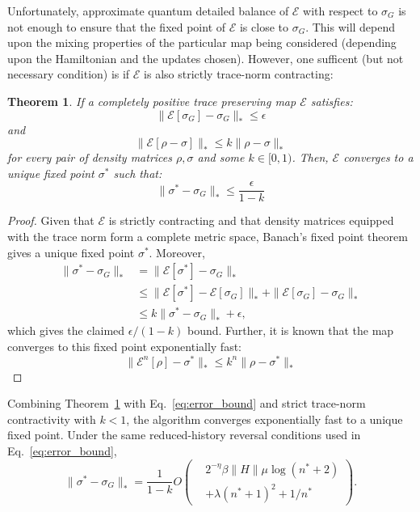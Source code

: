 \documentclass[aps,floatfix,10pt,amssymb,amsfont,amsmath,superscriptaddress,float,nofootinbib,longbibliography,nobalancelastpage,twocolumn]{revtex4-2}
\newtheorem{theorem}{Theorem}
\begin{document}
 Unfortunately, approximate quantum detailed balance of $\mathcal{E}$ with respect to $\sigma_G$ is not enough to ensure that the fixed point of $\mathcal{E}$ is close to $\sigma_G$. This will depend upon the mixing properties of the particular map being considered (depending upon the Hamiltonian and the updates chosen). However, one sufficent (but not necessary condition) is if $\mathcal{E}$ is also strictly trace-norm contracting:
 \begin{theorem}
     If a completely positive trace preserving map $\mathcal{E}$ satisfies:
     \begin{equation}
         \|\mathcal{E}[\sigma_G] - \sigma_G\|_* \leq \epsilon
     \end{equation}
     and
 \begin{equation}
     \|\mathcal{E}[\rho-\sigma]\|_* \leq k\|\rho-\sigma\|_*
 \end{equation}
 for every pair of density matrices $\rho,\sigma$ and some $k \in [0,1)$.
 Then, $\mathcal{E}$ converges to a unique fixed point $\sigma^*$ such that:
 \begin{equation}
     \| \sigma^* -\sigma_G\|_* \leq \frac{\epsilon}{1-k}
 \end{equation}
 \label{theorem:error_bound}
 \end{theorem}
 \begin{proof}
Given that $\mathcal{E}$ is strictly contracting and that density matrices
equipped with the trace norm form a complete metric space, Banach's fixed
point theorem gives a unique fixed point $\sigma^*$.
Moreover,
\begin{align}
 \|\sigma^*-\sigma_G\|_*
 &=\|\mathcal E[\sigma^*]-\sigma_G\|_*\\
 &\leq\|\mathcal E[\sigma^*]-\mathcal E[\sigma_G]\|_*
       +\|\mathcal E[\sigma_G]-\sigma_G\|_*\\
 &\leq k\|\sigma^*-\sigma_G\|_*+\epsilon,
\end{align}
which gives the claimed $\epsilon/(1-k)$ bound.
Further, it is known that the map converges to this fixed point exponentially fast:
\begin{equation}
     \|\mathcal{E}^n[\rho] -\sigma^*\|_* \leq k^n\| \rho - \sigma^*\|_*
\end{equation}
 \end{proof}

Combining Theorem~\ref{theorem:error_bound} with
Eq.~\eqref{eq:error_bound} and strict trace-norm contractivity with $k<1$,
the algorithm converges exponentially fast to a unique fixed point.  Under
the same reduced-history reversal conditions used in
Eq.~\eqref{eq:error_bound},
\begin{equation}
    \|\sigma^*-\sigma_G\|_*
    =\frac{1}{1-k}O\left(
    \begin{aligned}
      &2^{-\eta}\beta\|H\|\mu\log(n^*+2)\\[-0.2em]
      &+\lambda(n^*+1)^2+1/n^*
    \end{aligned}\right).
\end{equation}
\end{document}
